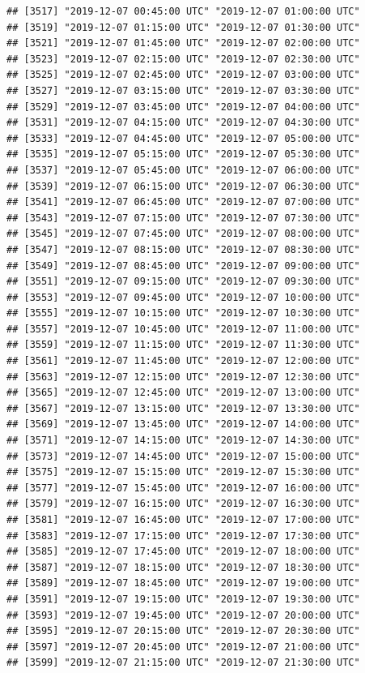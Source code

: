 \documentclass{article}\usepackage[]{graphicx}\usepackage[]{color}
\makeatletter
\newenvironment{kframe}{%
 \def\at@end@of@kframe{}%
 \ifinner\ifhmode%
  \def\at@end@of@kframe{\end{minipage}}%
  \begin{minipage}{\columnwidth}%
 \fi\fi%
 \def\FrameCommand##1{\hskip\@totalleftmargin \hskip-\fboxsep
 \colorbox{shadecolor}{##1}\hskip-\fboxsep
     \hskip-\linewidth \hskip-\@totalleftmargin \hskip\columnwidth}%
 \MakeFramed {\advance\hsize-\width
   \@totalleftmargin\z@ \linewidth\hsize
   \@setminipage}}%
 {\par\unskip\endMakeFramed%
 \at@end@of@kframe}
\newenvironment{knitrout}{}{} %
\makeatother
\begin{document}
\begin{knitrout}
\begin{kframe}
\begin{verbatim}
## [3517] "2019-12-07 00:45:00 UTC" "2019-12-07 01:00:00 UTC"
## [3519] "2019-12-07 01:15:00 UTC" "2019-12-07 01:30:00 UTC"
## [3521] "2019-12-07 01:45:00 UTC" "2019-12-07 02:00:00 UTC"
## [3523] "2019-12-07 02:15:00 UTC" "2019-12-07 02:30:00 UTC"
## [3525] "2019-12-07 02:45:00 UTC" "2019-12-07 03:00:00 UTC"
## [3527] "2019-12-07 03:15:00 UTC" "2019-12-07 03:30:00 UTC"
## [3529] "2019-12-07 03:45:00 UTC" "2019-12-07 04:00:00 UTC"
## [3531] "2019-12-07 04:15:00 UTC" "2019-12-07 04:30:00 UTC"
## [3533] "2019-12-07 04:45:00 UTC" "2019-12-07 05:00:00 UTC"
## [3535] "2019-12-07 05:15:00 UTC" "2019-12-07 05:30:00 UTC"
## [3537] "2019-12-07 05:45:00 UTC" "2019-12-07 06:00:00 UTC"
## [3539] "2019-12-07 06:15:00 UTC" "2019-12-07 06:30:00 UTC"
## [3541] "2019-12-07 06:45:00 UTC" "2019-12-07 07:00:00 UTC"
## [3543] "2019-12-07 07:15:00 UTC" "2019-12-07 07:30:00 UTC"
## [3545] "2019-12-07 07:45:00 UTC" "2019-12-07 08:00:00 UTC"
## [3547] "2019-12-07 08:15:00 UTC" "2019-12-07 08:30:00 UTC"
## [3549] "2019-12-07 08:45:00 UTC" "2019-12-07 09:00:00 UTC"
## [3551] "2019-12-07 09:15:00 UTC" "2019-12-07 09:30:00 UTC"
## [3553] "2019-12-07 09:45:00 UTC" "2019-12-07 10:00:00 UTC"
## [3555] "2019-12-07 10:15:00 UTC" "2019-12-07 10:30:00 UTC"
## [3557] "2019-12-07 10:45:00 UTC" "2019-12-07 11:00:00 UTC"
## [3559] "2019-12-07 11:15:00 UTC" "2019-12-07 11:30:00 UTC"
## [3561] "2019-12-07 11:45:00 UTC" "2019-12-07 12:00:00 UTC"
## [3563] "2019-12-07 12:15:00 UTC" "2019-12-07 12:30:00 UTC"
## [3565] "2019-12-07 12:45:00 UTC" "2019-12-07 13:00:00 UTC"
## [3567] "2019-12-07 13:15:00 UTC" "2019-12-07 13:30:00 UTC"
## [3569] "2019-12-07 13:45:00 UTC" "2019-12-07 14:00:00 UTC"
## [3571] "2019-12-07 14:15:00 UTC" "2019-12-07 14:30:00 UTC"
## [3573] "2019-12-07 14:45:00 UTC" "2019-12-07 15:00:00 UTC"
## [3575] "2019-12-07 15:15:00 UTC" "2019-12-07 15:30:00 UTC"
## [3577] "2019-12-07 15:45:00 UTC" "2019-12-07 16:00:00 UTC"
## [3579] "2019-12-07 16:15:00 UTC" "2019-12-07 16:30:00 UTC"
## [3581] "2019-12-07 16:45:00 UTC" "2019-12-07 17:00:00 UTC"
## [3583] "2019-12-07 17:15:00 UTC" "2019-12-07 17:30:00 UTC"
## [3585] "2019-12-07 17:45:00 UTC" "2019-12-07 18:00:00 UTC"
## [3587] "2019-12-07 18:15:00 UTC" "2019-12-07 18:30:00 UTC"
## [3589] "2019-12-07 18:45:00 UTC" "2019-12-07 19:00:00 UTC"
## [3591] "2019-12-07 19:15:00 UTC" "2019-12-07 19:30:00 UTC"
## [3593] "2019-12-07 19:45:00 UTC" "2019-12-07 20:00:00 UTC"
## [3595] "2019-12-07 20:15:00 UTC" "2019-12-07 20:30:00 UTC"
## [3597] "2019-12-07 20:45:00 UTC" "2019-12-07 21:00:00 UTC"
## [3599] "2019-12-07 21:15:00 UTC" "2019-12-07 21:30:00 UTC"

\end{verbatim}
\end{kframe}
\end{knitrout}
\end{document}
